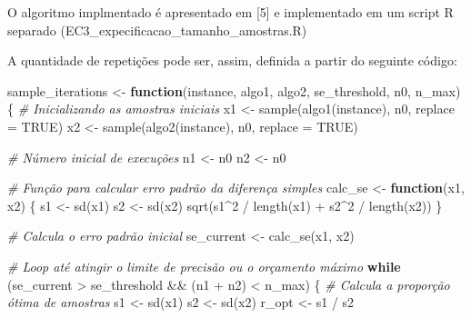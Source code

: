 \documentclass[
]{article}
\newenvironment{Shaded}{\begin{snugshade}}{\end{snugshade}}
\newcommand{\AttributeTok}[1]{\textcolor[rgb]{0.77,0.63,0.00}{#1}}
\newcommand{\CommentTok}[1]{\textcolor[rgb]{0.56,0.35,0.01}{\textit{#1}}}
\newcommand{\ConstantTok}[1]{\textcolor[rgb]{0.00,0.00,0.00}{#1}}
\newcommand{\ControlFlowTok}[1]{\textcolor[rgb]{0.13,0.29,0.53}{\textbf{#1}}}
\newcommand{\DecValTok}[1]{\textcolor[rgb]{0.00,0.00,0.81}{#1}}
\newcommand{\FunctionTok}[1]{\textcolor[rgb]{0.00,0.00,0.00}{#1}}
\newcommand{\NormalTok}[1]{#1}
\newcommand{\OtherTok}[1]{\textcolor[rgb]{0.56,0.35,0.01}{#1}}
\newcommand{\SpecialCharTok}[1]{\textcolor[rgb]{0.00,0.00,0.00}{#1}}
\begin{document}
O algoritmo implmentado é apresentado em {[}5{]} e implementado em um
script R separado (EC3\_expecificacao\_tamanho\_amostras.R)

A quantidade de repetições pode ser, assim, definida a partir do
seguinte código:

\begin{Shaded}
\begin{Highlighting}[]
\NormalTok{sample\_iterations }\OtherTok{\textless{}{-}} \ControlFlowTok{function}\NormalTok{(instance, algo1, algo2, se\_threshold, n0, n\_max) \{}
  \CommentTok{\# Inicializando as amostras iniciais}
\NormalTok{  x1 }\OtherTok{\textless{}{-}} \FunctionTok{sample}\NormalTok{(}\FunctionTok{algo1}\NormalTok{(instance), n0, }\AttributeTok{replace =} \ConstantTok{TRUE}\NormalTok{)}
\NormalTok{  x2 }\OtherTok{\textless{}{-}} \FunctionTok{sample}\NormalTok{(}\FunctionTok{algo2}\NormalTok{(instance), n0, }\AttributeTok{replace =} \ConstantTok{TRUE}\NormalTok{)}
  
  \CommentTok{\# Número inicial de execuções}
\NormalTok{  n1 }\OtherTok{\textless{}{-}}\NormalTok{ n0}
\NormalTok{  n2 }\OtherTok{\textless{}{-}}\NormalTok{ n0}
  
  \CommentTok{\# Função para calcular erro padrão da diferença simples}
\NormalTok{  calc\_se }\OtherTok{\textless{}{-}} \ControlFlowTok{function}\NormalTok{(x1, x2) \{}
\NormalTok{    s1 }\OtherTok{\textless{}{-}} \FunctionTok{sd}\NormalTok{(x1)}
\NormalTok{    s2 }\OtherTok{\textless{}{-}} \FunctionTok{sd}\NormalTok{(x2)}
    \FunctionTok{sqrt}\NormalTok{(s1}\SpecialCharTok{\^{}}\DecValTok{2} \SpecialCharTok{/} \FunctionTok{length}\NormalTok{(x1) }\SpecialCharTok{+}\NormalTok{ s2}\SpecialCharTok{\^{}}\DecValTok{2} \SpecialCharTok{/} \FunctionTok{length}\NormalTok{(x2))}
\NormalTok{  \}}
  
  \CommentTok{\# Calcula o erro padrão inicial}
\NormalTok{  se\_current }\OtherTok{\textless{}{-}} \FunctionTok{calc\_se}\NormalTok{(x1, x2)}
  
  \CommentTok{\# Loop até atingir o limite de precisão ou o orçamento máximo}
  \ControlFlowTok{while}\NormalTok{ (se\_current }\SpecialCharTok{\textgreater{}}\NormalTok{ se\_threshold }\SpecialCharTok{\&\&}\NormalTok{ (n1 }\SpecialCharTok{+}\NormalTok{ n2) }\SpecialCharTok{\textless{}}\NormalTok{ n\_max) \{}
    \CommentTok{\# Calcula a proporção ótima de amostras}
\NormalTok{    s1 }\OtherTok{\textless{}{-}} \FunctionTok{sd}\NormalTok{(x1)}
\NormalTok{    s2 }\OtherTok{\textless{}{-}} \FunctionTok{sd}\NormalTok{(x2)}
\NormalTok{    r\_opt }\OtherTok{\textless{}{-}}\NormalTok{ s1 }\SpecialCharTok{/}\NormalTok{ s2}
    

\end{Highlighting}
\end{Shaded}
\end{document}
